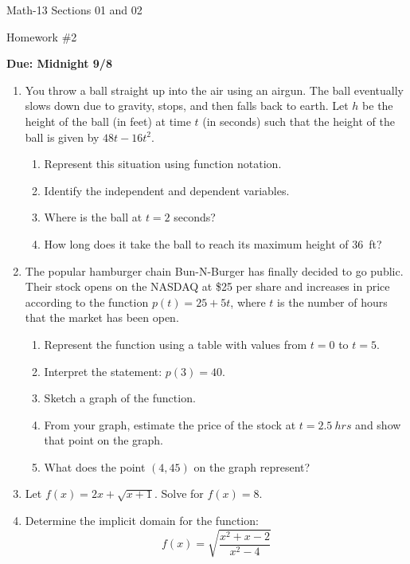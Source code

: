 \documentclass[letterpaper,12pt,fleqn]{article}
\begin{document}
\begin{center}
  \large
  Math-13 Sections 01 and 02

  \Large
  Homework \#2

  \large
  \textbf{Due: Midnight 9/8}
\end{center}

\begin{enumerate}
\item You throw a ball straight up into the air using an airgun.  The ball eventually slows down due to gravity,
  stops, and then falls back to earth.  Let \(h\) be the height of the ball (in feet) at time \(t\) (in seconds)
  such that the height of the ball is given by \(48t-16t^2\).
  \begin{enumerate}
  \item Represent this situation using function notation.
  \item Identify the independent and dependent variables.
  \item Where is the ball at \(t=2\) seconds?
  \item How long does it take the ball to reach its maximum height of \SI{36}{ft}?
  \end{enumerate}

\item The popular hamburger chain Bun-N-Burger has finally decided to go public.  Their stock opens on the NASDAQ
  at \$25 per share and increases in price according to the function \(p(t)=25+5t\), where \(t\) is the number of
  hours that the market has been open.
  \begin{enumerate}
  \item Represent the function using a table with values from \(t=0\) to \(t=5\).
  \item Interpret the statement: \(p(3)=40\).
  \item Sketch a graph of the function.
  \item From your graph, estimate the price of the stock at \(t=\SI{2.5}{hrs}\) and show that point on the graph.
  \item What does the point \((4,45)\) on the graph represent?
  \end{enumerate}

\item Let \(f(x)=2x+\sqrt{x+1}\).  Solve for \(f(x)=8\).

\item Determine the implicit domain for the function:
  \[f(x)=\sqrt{\frac{x^2+x-2}{x^2-4}}\]
  
\end{enumerate}
\end{document}
